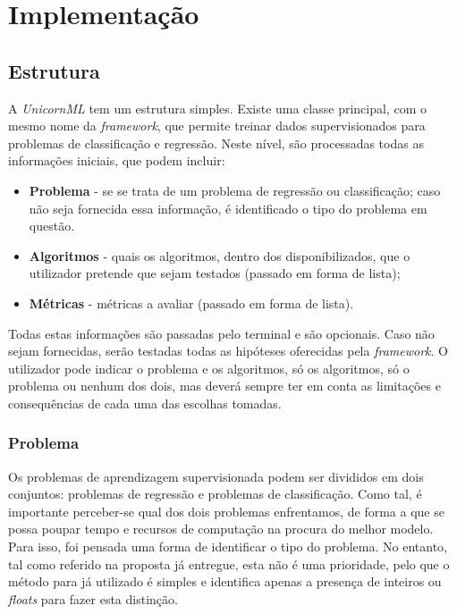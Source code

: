 \documentclass[a4paper]{report}
\begin{document}
\chapter{Implementação} \label{ch:Implementation}
\large {
	\section{Estrutura} \label{sec:Structure}
	A \textsl{UnicornML} tem um estrutura simples. Existe uma classe principal, com o mesmo nome da \textit{framework}, que permite treinar dados supervisionados para problemas de classificação e regressão.
	Neste nível, são processadas todas as informações iniciais, que podem incluir:
	\begin{itemize}
		\item \textbf{Problema} - se se trata de um problema de regressão ou classificação; caso não seja fornecida essa informação, é identificado o tipo do problema em questão.
		\item \textbf{Algoritmos} - quais os algoritmos, dentro dos disponibilizados, que o utilizador pretende que sejam testados (passado em forma de lista);
		\item \textbf{Métricas} - métricas a avaliar (passado em forma de lista).
	\end{itemize}

	Todas estas informações são passadas pelo terminal e são opcionais. Caso não sejam fornecidas, serão testadas todas as hipóteses oferecidas pela \textit{framework}.
	O utilizador pode indicar o problema e os algoritmos, só os algoritmos, só o problema ou nenhum dos dois, mas deverá sempre ter em conta as limitações e consequências de cada uma das escolhas tomadas.

		\subsection{Problema} \label{subsec:Problem}
		Os problemas de aprendizagem supervisionada podem ser divididos em dois conjuntos: problemas de regressão e problemas de classificação.
		Como tal, é importante perceber-se qual dos dois problemas enfrentamos, de forma a que se possa poupar tempo e recursos de computação na procura do melhor modelo.
		Para isso, foi pensada uma forma de identificar o tipo do problema. No entanto, tal como referido na proposta já entregue, esta não é uma prioridade,
		pelo que o método para já utilizado é simples e identifica apenas a presença de inteiros ou \textit{floats} para fazer esta distinção.

}
\end{document}
